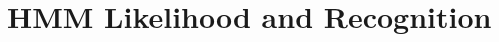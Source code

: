 \documentclass{nada-ten}
\begin{document}


\clearpage
\section{HMM Likelihood and Recognition}
\end{document}

